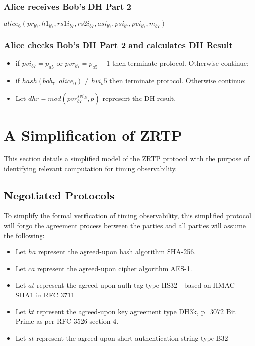 \documentclass[11pt]{article}
\begin{document}
  \subsubsection{Alice receives Bob's DH Part 2}
  $alice_6(pr_{b7},h1_{b7},rs1i_{b7},rs2i_{b7},asi_{b7},
           psi_{b7},pvi_{b7},m_{b7})$
  \subsubsection{Alice checks Bob's DH Part 2 and calculates DH 
               Result}
  \begin{itemize}
    \item if $pvi_{b7} = p_{a5}$ or $pvr_{b7} = p_{a5} - 1$ then 
          terminate protocol. Otherwise continue:
    \item if $hash(bob_7 || alice_0) \neq hvi_b5$ then terminate 
          protocol. Otherwise continue:
    \item Let $dhr = mod(pvr_{b7}^{svi_{a5}},p)$ represent the 
          DH result.
  \end{itemize}
  \newpage
  \section{A Simplification of ZRTP}
  This section details a simplified model of the ZRTP protocol with the
  purpose of identifying relevant computation for timing observability.
  \subsection{Negotiated Protocols}
  To simplify the formal verification of timing observability, 
  this simplified protocol will forgo the agreement process between
  the parties and all parties will assume the following:
  \begin{itemize}
    \item Let $ha$ represent the agreed-upon hash algorithm 
          SHA-256.
    \item Let $ca$ represent the agreed-upon cipher algorithm 
          AES-1.
    \item Let $at$ represent the agreed-upon auth tag type
          HS32 - based on HMAC-SHA1 in RFC 3711.
    \item Let $kt$ represent the agreed-upon key agreement
          type DH3k, p=3072 Bit Prime as per RFC 3526 section 4.
    \item Let $st$ represent the agreed-upon short authentication
          string type B32
  \end{itemize}
\end{document}
